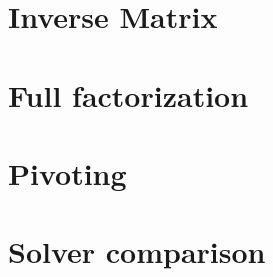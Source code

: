 \documentclass[fontsize = 10pt,DIV = 13]{scrartcl}
\begin{document}










\section{Inverse Matrix}
\label{sec:InverseMatrix}

\section{Full factorization}
\label{sec:fullFactorization}

\section{Pivoting}
\label{sec:pivoting}


\section{Solver comparison}
\label{sec:solverSelection}
\end{document}
